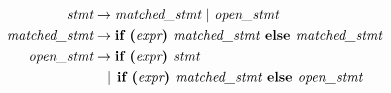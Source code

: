 
\begin{align}
\textit{stmt} &\rightarrow \textit{matched\_stmt} \text{ | } \textit{open\_stmt} \\
\textit{matched\_stmt} &\rightarrow \textbf{if } \textbf{(}\textit{expr}\textbf{) } \textit{matched\_stmt} \textbf{ else } \textit{matched\_stmt} \\
\textit{open\_stmt} &\rightarrow \textbf{if } \textbf{(}\textit{expr}\textbf{) } \textit{stmt} \\
&\phantom{\rightarrow}| \hspace{0.15cm} \textbf{if } \textbf{(}\textit{expr}\textbf{) } \textit{matched\_stmt} \textbf{ else } \textit{open\_stmt}
\end{align}
